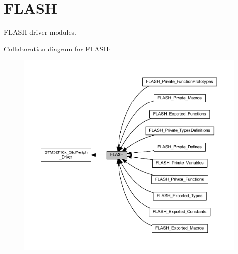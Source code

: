 \hypertarget{group___f_l_a_s_h}{}\section{F\+L\+A\+SH}
\label{group___f_l_a_s_h}


F\+L\+A\+SH driver modules.  


Collaboration diagram for F\+L\+A\+SH\+:
\nopagebreak
\begin{figure}[H]
\begin{center}
\leavevmode
\includegraphics[width=350pt]{group___f_l_a_s_h}
\end{center}
\end{figure}
